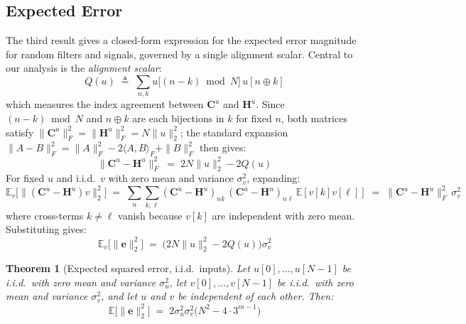 \documentclass[11pt]{article}
\newtheorem{theorem}{Theorem}
\begin{document}
\subsection{Expected Error}
\label{sec:expected-error}

The third result gives a closed-form expression for the expected error magnitude for random filters and signals, governed by a single alignment scalar. Central to our analysis is the \emph{alignment scalar}:
\begin{equation}
    \label{eq:Q-def}
    Q(u) \;\triangleq\; \sum_{n,k} u\bigl[(n-k)\bmod N\bigr]\,u[n\oplus k]
\end{equation}
which measures the index agreement between $\mathbf{C}^u$ and $\mathbf{H}^u$. Since $(n-k)\bmod N$ and $n\oplus k$ are each bijections in $k$ for fixed $n$, both matrices satisfy $\|\mathbf{C}^u\|_F^2 = \|\mathbf{H}^u\|_F^2 = N\|u\|_2^2$; the standard expansion $\|A-B\|_F^2 = \|A\|_F^2 - 2\langle A,B\rangle_F + \|B\|_F^2$ then gives:
\begin{equation}
    \label{eq:frobenius}
    \|\mathbf{C}^u-\mathbf{H}^u\|_F^2 \;=\; 2N\|u\|_2^2 - 2Q(u)
\end{equation}
For fixed $u$ and i.i.d.\ $v$ with zero mean and variance $\sigma_v^2$, expanding:
\begin{equation}
    \label{eq:Av-expand}
    \mathbb{E}_v\bigl[\|(\mathbf{C}^u-\mathbf{H}^u)v\|_2^2\bigr] \;=\; \sum_{n}\sum_{k,\ell} (\mathbf{C}^u-\mathbf{H}^u)_{nk}\,(\mathbf{C}^u-\mathbf{H}^u)_{n\ell}\,\mathbb{E}[v[k]v[\ell]] \;=\; \|\mathbf{C}^u-\mathbf{H}^u\|_F^2\,\sigma_v^2
\end{equation}
where cross-terms $k\neq\ell$ vanish because $v[k]$ are independent with zero mean. Substituting gives:
\begin{equation}
    \label{eq:fixed-filter-error}
    \mathbb{E}_v\bigl[\|\mathbf{e}\|_2^2\bigr] \;=\; \bigl(2N\|u\|_2^2 - 2Q(u)\bigr)\sigma_v^2
\end{equation}

\medskip
\begin{theorem}[Expected squared error, i.i.d.\ inputs]\label{thm:expected-error}
Let $u[0],\ldots,u[N-1]$ be i.i.d.\ with zero mean and variance $\sigma_u^2$, let $v[0],\ldots,v[N-1]$ be i.i.d.\ with zero mean and variance $\sigma_v^2$, and let $u$ and $v$ be independent of each other. Then:
\begin{equation}
    \label{eq:expected-error}
    \mathbb{E}\bigl[\|\mathbf{e}\|_2^2\bigr] \;=\; 2\sigma_u^2\sigma_v^2\bigl(N^2 - 4\cdot 3^{m-1}\bigr)
\end{equation}
\end{theorem}
\end{document}
